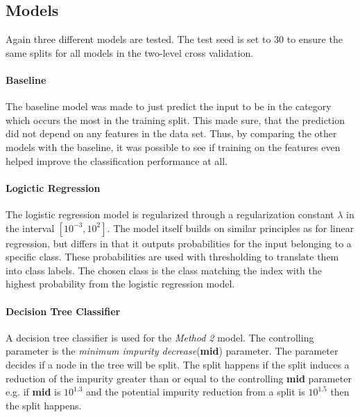 \subsection{Models}
Again three different models are tested. The test seed is set to 30 to ensure the same splits for all models in the two-level cross validation.

\paragraph{Baseline}
The baseline model was made to just predict the input to be in the category which occurs the most in the training split. This made sure, that the prediction did not depend on any features in the data set. Thus, by comparing the other models with the baseline, it was possible to see if training on the features even helped improve the classification performance at all.

\paragraph{Logictic Regression}
The logistic regression model is regularized through a regularization constant $\lambda$ in the interval $[10^{-3},10^{2}]$. The model itself builds on similar principles as for linear regression, but differs in that it outputs probabilities for the input belonging to a specific class. These probabilities are used with thresholding to translate them into class labels. The chosen class is the class matching the index with the highest probability from the logistic regression model.

\paragraph{Decision Tree Classifier}
A decision tree classifier is used for the \textit{Method 2} model. The controlling parameter is the \textit{minimum impurity decrease}(\textbf{mid}) parameter. The parameter decides if a node in the tree will be split. The split happens if the split induces a reduction of the impurity greater than or equal to the controlling \textbf{mid} parameter e.g. if \textbf{mid} is $10^{1.3}$ and the potential impurity reduction from a split is $10^{1.5}$ then the split happens.


